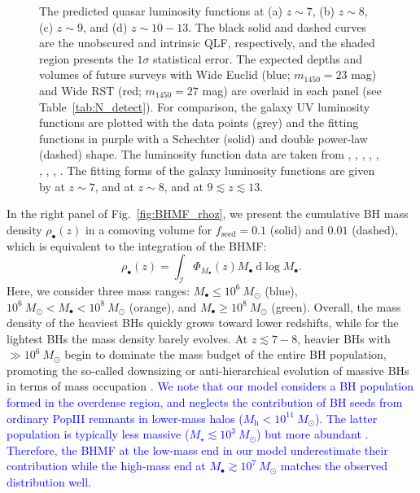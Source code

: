 \documentclass[twocolumn, twocolappendix]{aastex63}
\newcommand{\Msun}{M_\odot}
\newcommand{\Mh}{M_\mathrm{h}}
\newcommand{\Mbh}{M_\bullet}
\newcommand{\fseed}{f_\mathrm{seed}}
\newcommand{\D}{\mathrm{d}}
\newcommand{\blue}[1]{\textcolor{blue}{ #1}}
\begin{document}
\begin{CJK*}{UTF8}{gbsn}
\begin{figure}
\caption{
The predicted quasar luminosity functions at (a) $z\sim 7$, (b) $z\sim 8$, (c) $z\sim 9$, and (d) $z\sim 10-13$.
The black solid and dashed curves are the unobscured and intrinsic QLF, respectively, and the shaded region presents the $1\sigma$ statistical error.
The expected depths and volumes of future surveys with Wide Euclid (blue; $m_{1450}= 23$ mag) and Wide RST (red; $m_{1450}= 27$ mag) are overlaid in each panel (see Table~\ref{tab:N_detect}).
For comparison, the galaxy UV luminosity functions are plotted with the data points (grey) and the fitting functions in purple with a Schechter (solid) and double power-law (dashed) shape.
The luminosity function data are taken from \citet{2013MNRAS.432.2696M}, \citet{2016ApJ...819..129O}, \citet{2018ApJ...867..150M},
\citet{2019ApJ...883...99S}, \citet{2020MNRAS.493.2059B}, \citet{2021AJ....162...47B},
\citet{2022ApJS..259...20H,Harikane_2022b,Harikane_2022c}, \citet{2022arXiv220712356D}, \citet{2022arXiv220709434N}.
The fitting forms of the galaxy luminosity functions are given by \citet{2022ApJS..259...20H} at $z\sim 7$, 
\citet{2020MNRAS.493.2059B} and \citet{2013MNRAS.432.2696M} at $z\sim 8$, and \citet{Harikane_2022c} at $9\lesssim z\lesssim 13$.}
\label{fig:LFs}
\vspace{5mm}
\end{figure}



In the right panel of Fig.~\ref{fig:BHMF_rhoz}, we present the cumulative BH mass density $\rho_\bullet(z)$ in a comoving volume
for $\fseed=0.1$ (solid) and $0.01$ (dashed),
which is equivalent to the integration of the BHMF:
%
\begin{equation}
 \rho_\bullet(z)=\int_{\mathcal{I}} \Phi_{\Mbh} (z) \Mbh ~\D \log \Mbh.
\end{equation}
%
Here, we consider three mass ranges: $M_\bullet \leq 10^6~\Msun$ (blue), $10^6~\Msun < M_\bullet < 10^8~\Msun$ (orange),
and $M_\bullet \geq 10^8~\Msun$ (green).
Overall, the mass density of the heaviest BHs quickly grows toward lower redshifts,
while for the lightest BHs the mass density barely evolves.
At $z\lesssim 7-8$, heavier BHs with $\gg 10^6~\Msun$ begin to dominate the mass budget of the entire BH population,
promoting the so-called downsizing or anti-hierarchical evolution of massive BHs 
in terms of mass occupation \citep[e.g.,][]{2014ApJ...786..104U}.
\blue{
We note that our model considers a BH population formed in the overdense region,
and neglects the contribution of BH seeds from ordinary PopIII remnants in lower-mass halos ($\Mh<10^{11}~\Msun$).
The latter population is typically less massive ($M_\star \lesssim 10^3~\Msun$) but more abundant \citep[e.g.,][]{2015MNRAS.448..568H,2022arXiv220614459T}.
Therefore, the BHMF at the low-mass end in our model underestimate their contribution while
the high-mass end at $M_\bullet \gtrsim 10^7~\Msun$ matches the observed distribution well.
}




\end{CJK*}
\end{document}
